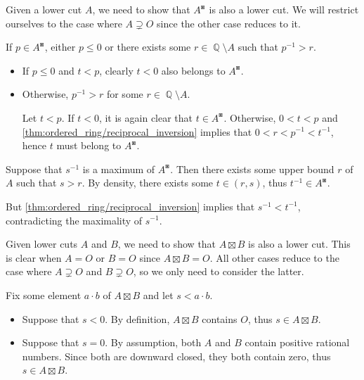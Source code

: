 \begin{defproof}
   Given a lower cut \( A \), we need to show that \( A^\boxast \) is also a lower cut. We will restrict ourselves to the case where \( A \supsetneq O \) since the other case reduces to it.

   If \( p \in A^\boxast \), either \( p \leq 0 \) or there exists some \( r \in \BbbQ \setminus A \) such that \( p^{-1} > r \).

  \begin{itemize}
    \item If \( p \leq 0 \) and \( t < p \), clearly \( t < 0 \) also belongs to \( A^\boxast \).

    \item Otherwise, \( p^{-1} > r \) for some \( r \in \BbbQ \setminus A \).

    Let \( t < p \). If \( t < 0 \), it is again clear that \( t \in A^\boxast \). Otherwise, \( 0 < t < p \) and \cref{thm:ordered_ring/reciprocal_inversion} implies that \( 0 < r < p^{-1} < t^{-1} \), hence \( t \) must belong to \( A^\boxast \).
  \end{itemize}

   Suppose that \( s^{-1} \) is a maximum of \( A^\boxast \). Then there exists some upper bound \( r \) of \( A \) such that \( s > r \). By density, there exists some \( t \in (r, s) \), thus \( t^{-1} \in A^\boxast \).

  But \cref{thm:ordered_ring/reciprocal_inversion} implies that \( s^{-1} < t^{-1} \), contradicting the maximality of \( s^{-1} \).

   Given lower cuts \( A \) and \( B \), we need to show that \( A \boxtimes B \) is also a lower cut. This is clear when \( A = O \) or \( B = O \) since \( A \boxtimes B = O \). All other cases reduce to the case where \( A \supsetneq O \) and \( B \supsetneq O \), so we only need to consider the latter.

   Fix some element \( a \cdot b \) of \( A \boxtimes B \) and let \( s < a \cdot b \).

  \begin{itemize}
    \item Suppose that \( s < 0 \). By definition, \( A \boxtimes B \) contains \( O \), thus \( s \in A \boxtimes B \).

    \item Suppose that \( s = 0 \). By assumption, both \( A \) and \( B \) contain positive rational numbers. Since both are downward closed, they both contain zero, thus \( s \in A \boxtimes B \).


\end{itemize}
\end{defproof}
